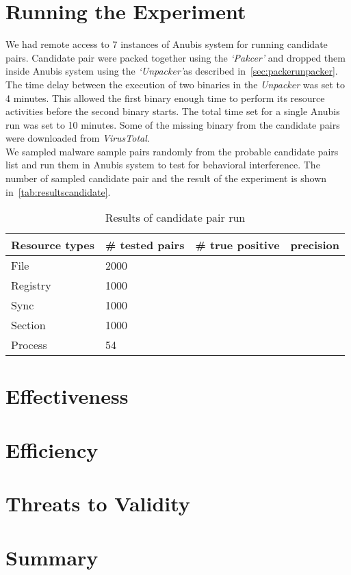 \section{Running the Experiment}
\label{sec:Running the Experiment}
We had remote access to 7 instances of Anubis system for running candidate pairs.
Candidate pair were packed together using the \emph{`Pakcer'} and dropped them inside Anubis system using the \emph{`Unpacker'}as described in~\ref{sec:packerunpacker}.
The time delay between the execution of two binaries in the \emph{Unpacker} was set to 4 minutes.
This allowed the first binary enough time to perform its resource activities before the second binary starts.
The total time set for a single Anubis run was set to 10 minutes.
Some of the missing binary from the candidate pairs were downloaded from \emph{VirusTotal}.\\

We sampled malware sample pairs randomly from the probable candidate pairs list and run them in Anubis system to test for behavioral interference.
The number of sampled candidate pair and the result of the experiment is shown in~\autoref{tab:resultscandidate}.
\begin{table}[ht]
  \caption[Results of candidate pair run]{Results of candidate pair run}\label{tab:resultscandidate}
  \centering
  \begin{tabular}{l l l l}
    \toprule
    Resource types & \# tested pairs & \# true positive & precision\\
    \midrule
    File & 2000\\
    Registry & 1000\\
    Sync & 1000\\
    Section & 1000\\
    Process & 54\\
    \bottomrule
  \end{tabular}
\end{table}
\section{Effectiveness}
\label{sec:Effectiveness}
\section{Efficiency}
\label{sec:Efficiency}


\section{Threats to Validity}
\label{sec:Threats to Validity}

\section{Summary}
\label{sec:Summary}
